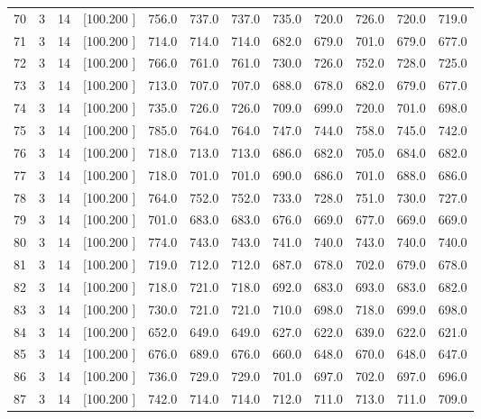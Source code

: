 \documentclass[12pt,a4paper]{article}
\begin{document}
\begin{center}
{\begin{tabular}{r r r r r r r r r r r r}
  70&  3& 14&[100.200   ]&   756.0&   737.0&   737.0&   735.0&   720.0&   726.0&   720.0&   719.0\\[-0.02in]
  71&  3& 14&[100.200   ]&   714.0&   714.0&   714.0&   682.0&   679.0&   701.0&   679.0&   677.0\\[-0.02in]
  72&  3& 14&[100.200   ]&   766.0&   761.0&   761.0&   730.0&   726.0&   752.0&   728.0&   725.0\\[-0.02in]
  73&  3& 14&[100.200   ]&   713.0&   707.0&   707.0&   688.0&   678.0&   682.0&   679.0&   677.0\\[-0.02in]
  74&  3& 14&[100.200   ]&   735.0&   726.0&   726.0&   709.0&   699.0&   720.0&   701.0&   698.0\\[-0.02in]
  75&  3& 14&[100.200   ]&   785.0&   764.0&   764.0&   747.0&   744.0&   758.0&   745.0&   742.0\\[-0.02in]
  76&  3& 14&[100.200   ]&   718.0&   713.0&   713.0&   686.0&   682.0&   705.0&   684.0&   682.0\\[-0.02in]
  77&  3& 14&[100.200   ]&   718.0&   701.0&   701.0&   690.0&   686.0&   701.0&   688.0&   686.0\\[-0.02in]
  78&  3& 14&[100.200   ]&   764.0&   752.0&   752.0&   733.0&   728.0&   751.0&   730.0&   727.0\\[-0.02in]
  79&  3& 14&[100.200   ]&   701.0&   683.0&   683.0&   676.0&   669.0&   677.0&   669.0&   669.0\\[-0.02in]
  80&  3& 14&[100.200   ]&   774.0&   743.0&   743.0&   741.0&   740.0&   743.0&   740.0&   740.0\\[-0.02in]
  81&  3& 14&[100.200   ]&   719.0&   712.0&   712.0&   687.0&   678.0&   702.0&   679.0&   678.0\\[-0.02in]
  82&  3& 14&[100.200   ]&   718.0&   721.0&   718.0&   692.0&   683.0&   693.0&   683.0&   682.0\\[-0.02in]
  83&  3& 14&[100.200   ]&   730.0&   721.0&   721.0&   710.0&   698.0&   718.0&   699.0&   698.0\\[-0.02in]
  84&  3& 14&[100.200   ]&   652.0&   649.0&   649.0&   627.0&   622.0&   639.0&   622.0&   621.0\\[-0.02in]
  85&  3& 14&[100.200   ]&   676.0&   689.0&   676.0&   660.0&   648.0&   670.0&   648.0&   647.0\\[-0.02in]
  86&  3& 14&[100.200   ]&   736.0&   729.0&   729.0&   701.0&   697.0&   702.0&   697.0&   696.0\\[-0.02in]
  87&  3& 14&[100.200   ]&   742.0&   714.0&   714.0&   712.0&   711.0&   713.0&   711.0&   709.0\\[-0.02in]

\end{tabular}}
\end{center}
\end{document}
